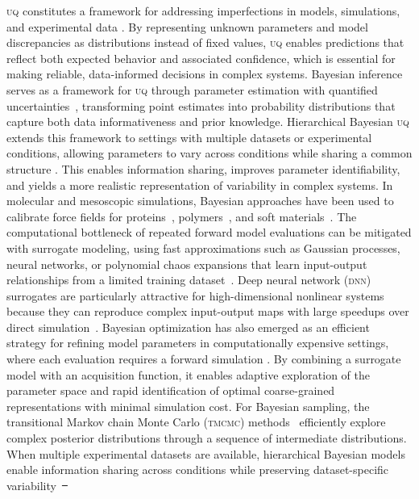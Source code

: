\documentclass[%
 aip,
 jcp,
 amsmath,amssymb,
 preprint,%
]{revtex4-1}
\makeatletter
\providecommand{\DIFdel}[1]{{\protect\color{red}\sout{#1}}} %
\providecommand{\DIFdelbegin}{} %
\let\sout@orig\sout %
\renewcommand{\sout}[1]{\ifmmode\text{\sout@orig{\ensuremath{#1}}}\else\sout@orig{#1}\fi} %
\makeatother
\begin{document}
\textsc{uq} constitutes a framework for addressing imperfections in models, simulations, and experimental data \citep{angelikopoulos2012bayesian}. By representing unknown parameters and model discrepancies as distributions instead of fixed values, \textsc{uq} enables predictions that reflect both expected behavior and associated confidence, which is essential for making reliable, data-informed decisions in complex systems. Bayesian inference serves as a framework for \textsc{uq} through parameter estimation with quantified uncertainties~\citep{gelman2013bayesian,gregory2005bayesian,nordman2025bayesian,amoudruz2025bayesian}, transforming point estimates into probability distributions that capture both data informativeness and prior knowledge. Hierarchical Bayesian \textsc{uq} extends this framework to settings with multiple datasets or experimental conditions, allowing parameters to vary across conditions while sharing a common structure \citep{wu2016fusing}. This enables information sharing, improves parameter identifiability, and yields a more realistic representation of variability in complex systems. In molecular and mesoscopic simulations, Bayesian approaches have been used to calibrate force fields for proteins~\citep{cailliez2014calibration}, polymers~\citep{zhang2014polymer}, and soft materials~\citep{angelikopoulos2012bayesian}. The computational bottleneck of repeated forward model evaluations can be mitigated with surrogate modeling, using fast approximations such as Gaussian processes, neural networks, or polynomial chaos expansions that learn input-output relationships from a limited training dataset~\citep{rasmussen2006gaussian,wu2022multi}. Deep neural network (\textsc{dnn}) surrogates are particularly attractive for high-dimensional nonlinear systems because they can reproduce complex input-output maps with large speedups over direct simulation~\citep{raissi2019physics,lu2021deepxde}. Bayesian optimization has also emerged as an efficient strategy for refining model parameters in computationally expensive settings, where each evaluation requires a forward simulation \citep{ray2025refining}. By combining a surrogate model with an acquisition function, it enables adaptive exploration of the parameter space and rapid identification of optimal coarse-grained representations with minimal simulation cost. For Bayesian sampling, the transitional Markov chain Monte Carlo (\textsc{tmcmc}) methods~\citep{ching2007transitional,beck2002bayesian} efficiently explore complex posterior distributions through a sequence of intermediate distributions. When multiple experimental datasets are available, hierarchical Bayesian models enable information sharing across conditions while preserving dataset-specific variability~\DIFdelbegin \DIFdel{\mbox{%
}}
\end{document}
